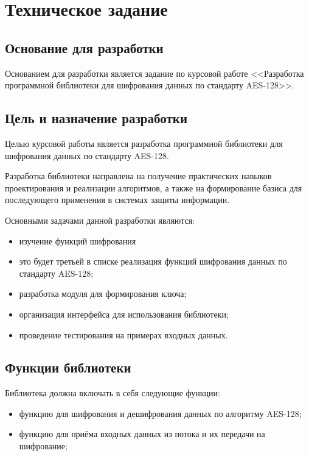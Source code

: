 \section{Техническое задание}
\subsection{Основание для разработки}

Основанием для разработки является задание по курсовой работе 
<<Разработка программной библиотеки для шифрования данных по стандарту AES-128>>. 

\subsection{Цель и назначение разработки}

Целью курсовой работы является разработка программной библиотеки для шифрования данных по стандарту AES-128.  

Разработка библиотеки направлена на получение практических навыков проектирования и реализации  алгоритмов, а также на формирование базиса для последующего применения в системах защиты информации.  

Основными задачами данной разработки являются:
\begin{itemize}
	Переделать по этапам типа с изучения и т.д
	\item изучение функций шифрования
	\item это будет третьей в списке реализация функций шифрования данных по стандарту AES-128;
	 \item разработка модуля для формирования ключа;
	\item организация интерфейса для использования библиотеки;
	\item проведение тестирования на примерах входных данных.
\end{itemize}

\subsection{Функции библиотеки}

Библиотека должна включать в себя следующие функции:
\begin{itemize}
	\item  функцию для шифрования и дешифрования данных по алгоритму AES-128;
	\item функцию для приёма входных данных из потока и их передачи на шифрование;
\end{itemize}


